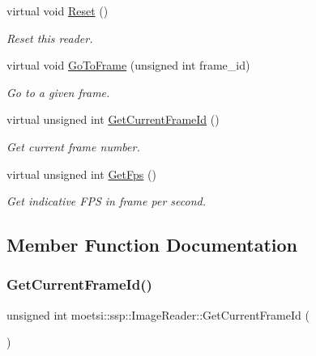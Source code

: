 \begin{DoxyCompactItemize}
virtual void \hyperlink{classmoetsi_1_1ssp_1_1ImageReader_ae9ffc89ceed365c96b8d50e46ee8dc20}{Reset} ()
\begin{DoxyCompactList}\small\item\em Reset this reader. \end{DoxyCompactList}\item 
virtual void \hyperlink{classmoetsi_1_1ssp_1_1ImageReader_a32eb88cc612e6920f4910e0803b0ce3c}{Go\+To\+Frame} (unsigned int frame\+\_\+id)
\begin{DoxyCompactList}\small\item\em Go to a given frame. \end{DoxyCompactList}\item 
virtual unsigned int \hyperlink{classmoetsi_1_1ssp_1_1ImageReader_a386125736df9f25e5c4312bb679ff031}{Get\+Current\+Frame\+Id} ()
\begin{DoxyCompactList}\small\item\em Get current frame number. \end{DoxyCompactList}\item 
virtual unsigned int \hyperlink{classmoetsi_1_1ssp_1_1ImageReader_a86adfec8106c366aaf1ec63e2a7da156}{Get\+Fps} ()
\begin{DoxyCompactList}\small\item\em Get indicative F\+PS in frame per second. \end{DoxyCompactList}\end{DoxyCompactItemize}


\subsection{Member Function Documentation}
\mbox{\label{classmoetsi_1_1ssp_1_1ImageReader_a386125736df9f25e5c4312bb679ff031}} 
\subsubsection{\texorpdfstring{Get\+Current\+Frame\+Id()}{GetCurrentFrameId()}}
{\footnotesize\ttfamily unsigned int moetsi\+::ssp\+::\+Image\+Reader\+::\+Get\+Current\+Frame\+Id (\begin{DoxyParamCaption}{ }\end{DoxyParamCaption})\hspace{0.3cm}{\ttfamily [virtual]}}



